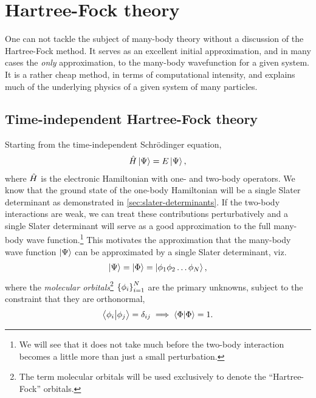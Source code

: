 \chapter{Hartree-Fock theory}
    \label{chap:hf}
    One can not tackle the subject of many-body theory without a discussion of
    the Hartree-Fock method. It serves as an excellent initial approximation,
    and in many cases the \emph{only} approximation, to the many-body
    wavefunction for a given system. It is a rather cheap method, in terms of
    computational intensity, and explains much of the underlying physics of a
    given system of many particles.

    \section{Time-independent Hartree-Fock theory}
        \label{sec:hf}
        Starting from the time-independent Schrödinger equation,
        \begin{align}
            \hat{H}\ket{\Psi} = E\ket{\Psi},
        \end{align}
        where $\hat{H}$ is the electronic Hamiltonian with one- and two-body
        operators.
        We know that the ground state of the one-body Hamiltonian will be a
        single Slater determinant as demonstrated in
        \autoref{sec:slater-determinants}.
        If the two-body interactions are weak, we can treat these contributions
        perturbatively and a single Slater determinant will serve as a good
        approximation to the full many-body wave function.\footnote{%
            We will see that it does not take much before the two-body
            interaction becomes a little more than just a small perturbation.
        }
        This motivates the approximation that the many-body wave function
        $\ket{\Psi}$ can be approximated by a single Slater determinant, viz.
        \begin{align}
            \ket{\Psi} = \ket{\Phi} = \ket{\phi_1 \phi_2 \dots \phi_N},
        \end{align}
        where the \emph{molecular orbitals}\footnote{%
            The term molecular orbitals will be used exclusively to denote the
            ``Hartree-Fock'' orbitals.
        } $\left\{ \phi_i \right\}_{i = 1}^{N}$ are the
        primary unknowns, subject to the constraint that they are orthonormal,
        \begin{align}
            \braket{\phi_i}{\phi_j} = \delta_{ij}
            \implies
            \braket{\Phi} = 1.
        \end{align}

